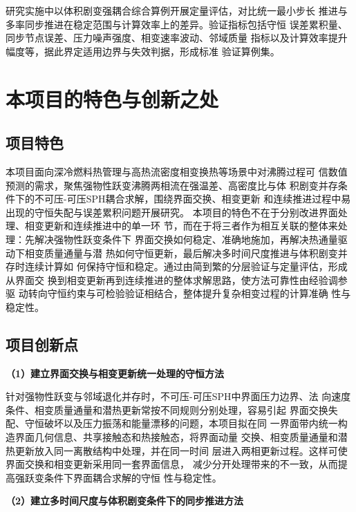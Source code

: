 研究实施中以体积剧变强耦合综合算例开展定量评估，对比统一最小步长
推进与多率同步推进在稳定范围与计算效率上的差异。验证指标包括守恒
误差累积量、同步节点误差、压力噪声强度、相变速率波动、邻域质量
指标以及计算效率提升幅度等，据此界定适用边界与失效判据，形成标准
验证算例集。

\newpage
\section{本项目的特色与创新之处}

\subsection{项目特色}
本项目面向深冷燃料热管理与高热流密度相变换热等场景中对沸腾过程可
信数值预测的需求，聚焦强物性跃变沸腾两相流在强温差、高密度比与体
积剧变并存条件下的不可压-可压SPH耦合求解，围绕界面交换、相变更新
和连续推进过程中易出现的守恒失配与误差累积问题开展研究。
本项目的特色不在于分别改进界面处理、相变更新和连续推进中的单一环
节，而在于将三者作为相互关联的整体来处理：先解决强物性跃变条件下
界面交换如何稳定、准确地施加，再解决热通量驱动下相变质量通量与潜
热如何守恒更新，最后解决多时间尺度推进与体积剧变并存时连续计算如
何保持守恒和稳定。通过由简到繁的分层验证与定量评估，形成从界面交
换到相变更新再到连续推进的整体求解思路，使方法可靠性由经验调参驱
动转向守恒约束与可检验验证相结合，整体提升复杂相变过程的计算准确
性与稳定性。

\subsection{项目创新点}

\textbf{（1）\textcolor{B}{\zhhei 建立界面交换与相变更新统一处理的守恒方法}}

针对强物性跃变与邻域退化并存时，不可压-可压SPH中界面压力边界、法
向速度条件、相变质量通量和潜热更新常按不同规则分别处理，容易引起
界面交换失配、守恒破坏以及压力振荡和能量漂移的问题，本项目拟在同
一界面带内统一构造界面几何信息、共享接触态和热接触态，将界面动量
交换、相变质量通量和潜热更新放入同一离散结构中处理，并在同一时间
层进入两相更新过程。这样可使界面交换和相变更新采用同一套界面信息，
减少分开处理带来的不一致，从而提高强跃变条件下界面耦合求解的守恒
性与稳定性。

\textbf{（2）\textcolor{B}{\zhhei 建立多时间尺度与体积剧变条件下的同步推进方法}}

